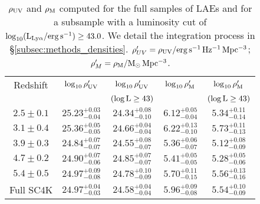 \documentclass[a4paper,fleqn,usenatbib]{mnras}
\begin{document}
%
%
\begin{table}
\setlength{\tabcolsep}{4pt}
\begin{center}
\caption{$\rho_{\rm UV}$ and $\rho_{\rm M}$ computed for the full samples of LAEs and for a subsample with a luminosity cut of $\log_{10} (\rm L_{Ly\alpha}/erg\,s^{-1}) \geq 43.0$. We detail the integration process in \S\ref{subsec:methods_densities}. $\rho'_{UV}=\rm\rho_{UV}/erg\,s^{-1}\,Hz^{-1}\,Mpc^{-3}$; $\rho'_{M}=\rm\rho_{M}/M_\odot\,Mpc^{-3}$.} \label{tab:rho}
\begin{tabular}{c | cccc}
\hline
\multicolumn{1}{c|}{Redshift} &
\multicolumn{1}{c|}{$\log_{10}\rm\rho'_{UV}$} &
\multicolumn{1}{c|}{$\log_{10}\rm\rho'_{UV}$} &
\multicolumn{1}{c|}{$\log_{10}\rm\rho'_{M}$} &
\multicolumn{1}{c|}{$\log_{10}\rm\rho'_{M}$} \\
&& $(\log\rm L\geq43)$& &$(\rm\log L\geq43)$\\
\hline
$2.5\pm0.1$ & $25.23^{+0.03}_{-0.04}$ & $24.34^{+0.08}_{-0.10}$ & $6.12^{+0.05}_{-0.04}$ & $5.34^{+0.11}_{-0.14}$\\
$3.1\pm0.4$ & $25.36^{+0.05}_{-0.05}$ & $24.66^{+0.04}_{-0.04}$ & $6.22^{+0.13}_{-0.10}$ & $5.73^{+0.11}_{-0.13}$\\
$3.9\pm0.3$ & $24.84^{+0.07}_{-0.07}$ & $24.55^{+0.08}_{-0.07}$ & $5.36^{+0.06}_{-0.07}$ & $5.12^{+0.08}_{-0.09}$\\
$4.7\pm0.2$ & $24.90^{+0.07}_{-0.06}$ & $24.85^{+0.07}_{-0.07}$ & $5.41^{+0.05}_{-0.05}$ & $5.28^{+0.05}_{-0.06}$\\
$5.4\pm0.5$ & $24.97^{+0.09}_{-0.08}$ & $24.78^{+0.10}_{-0.09}$ & $5.70^{+0.11}_{-0.15}$ & $5.56^{+0.13}_{-0.16}$\\
\hline
Full SC4K & $24.97^{+0.04}_{-0.03}$ & $24.58^{+0.04}_{-0.04}$ & $5.96^{+0.09}_{-0.08}$ & $5.54^{+0.10}_{-0.09}$\\
\hline
\end{tabular}
\end{center}
\end{table}
\end{document}
